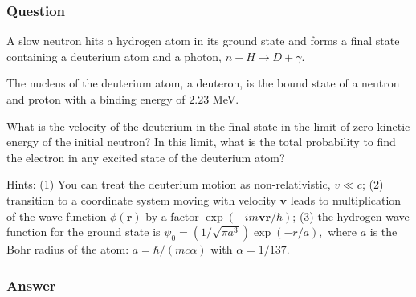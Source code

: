 \subsubsection{Question}
A slow neutron hits a hydrogen atom in its ground state and forms a final state containing a deuterium atom and a photon, $n+H\to D+\gamma$.

The nucleus of the deuterium atom, a deuteron, is the bound state of a neutron and proton with a binding energy of $2.23$ MeV.

What is the velocity of the deuterium in the final state in the limit of zero kinetic energy of the initial neutron? In this limit, what is the total probability to find the electron in any excited state of the deuterium atom?

Hints: (1) You can treat the deuterium motion as non-relativistic, $v \ll c$; (2) transition to a coordinate system moving with velocity $\mathbf{v}$ leads to multiplication of the wave function $\phi(\mathbf{r})$ by a factor $\exp(-im\mathbf{v}\mathbf{r}/\hbar)$; (3) the hydrogen wave function for the ground state is $\psi_0 = (1/\sqrt{\pi a^3})\exp(-r/a),$ where $a$ is the Bohr radius of the atom: $a = \hbar/(mc{\alpha})$ with ${\alpha} = 1/137.$
\subsubsection{Answer}

